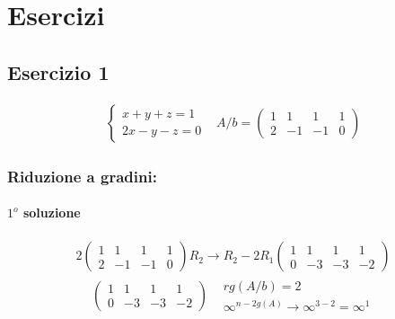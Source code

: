 
\chapter{Esercizi}
\label{chap:esercizi}

\section{Esercizio 1}
\label{sec:esercizio1}

\begin{eqnarray*}
  \begin{cases}
    x+y+z=1\\
    2x-y-z=0
  \end{cases} & A/b=
                \left(\begin{array}{ccc|l}
                  1&1&1 & 1 \\
                  2 & -1 & -1 &0
                \end{array}\right)
\end{eqnarray*}

\subsection{Riduzione a gradini:}
\label{sec:riduzioneagradini}

\subsubsection{$1^o$ soluzione}
\label{sec:soluzione1}

\begin{eqnarray*}
 2\left(
  \begin{array}{ccc|l}
    1&1&1 &1\\
    2 & -1 & -1 & 0
  \end{array}\right) R_2\to R_2-2R_1 \left(
  \begin{array}{ccc|l}
    1&1&1&1\\
    0 & -3 & -3&-2
  \end{array} \right)
\end{eqnarray*}
\begin{eqnarray*}
  \left(
  \begin{array}{ccc|l}
    1&1&1&1\\
    0 & -3 & -3&-2
  \end{array} \right) &
                        \begin{matrix}
                          rg(A/b)=2\\
                          \infty^{n-2g(A)} \to \infty^{3-2} = \infty^1
                        \end{matrix}
\end{eqnarray*}


